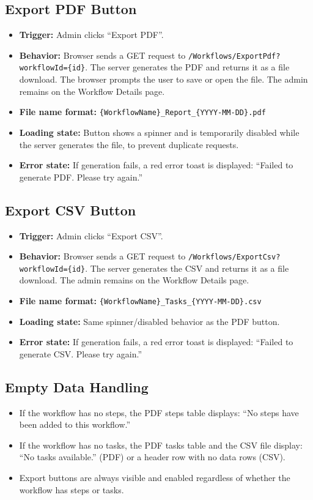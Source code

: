 \documentclass[12pt]{article}
\begin{document}
\subsection{Export PDF Button}
\begin{itemize}
    \item \textbf{Trigger:} Admin clicks ``Export PDF''.
    \item \textbf{Behavior:} Browser sends a GET request to
    \texttt{/Workflows/ExportPdf?workflowId=\{id\}}. The server generates the PDF and
    returns it as a file download. The browser prompts the user to save or open the file.
    The admin remains on the Workflow Details page.
    \item \textbf{File name format:} \texttt{\{WorkflowName\}\_Report\_\{YYYY-MM-DD\}.pdf}
    \item \textbf{Loading state:} Button shows a spinner and is temporarily disabled while
    the server generates the file, to prevent duplicate requests.
    \item \textbf{Error state:} If generation fails, a red error toast is displayed:
    ``Failed to generate PDF. Please try again.''
\end{itemize}

\subsection{Export CSV Button}
\begin{itemize}
    \item \textbf{Trigger:} Admin clicks ``Export CSV''.
    \item \textbf{Behavior:} Browser sends a GET request to
    \texttt{/Workflows/ExportCsv?workflowId=\{id\}}. The server generates the CSV and
    returns it as a file download. The admin remains on the Workflow Details page.
    \item \textbf{File name format:} \texttt{\{WorkflowName\}\_Tasks\_\{YYYY-MM-DD\}.csv}
    \item \textbf{Loading state:} Same spinner/disabled behavior as the PDF button.
    \item \textbf{Error state:} If generation fails, a red error toast is displayed:
    ``Failed to generate CSV. Please try again.''
\end{itemize}

\subsection{Empty Data Handling}
\begin{itemize}
    \item If the workflow has no steps, the PDF steps table displays: ``No steps have been
    added to this workflow.''
    \item If the workflow has no tasks, the PDF tasks table and the CSV file display:
    ``No tasks available.'' (PDF) or a header row with no data rows (CSV).
    \item Export buttons are always visible and enabled regardless of whether the workflow
    has steps or tasks.
\end{itemize}
\end{document}
